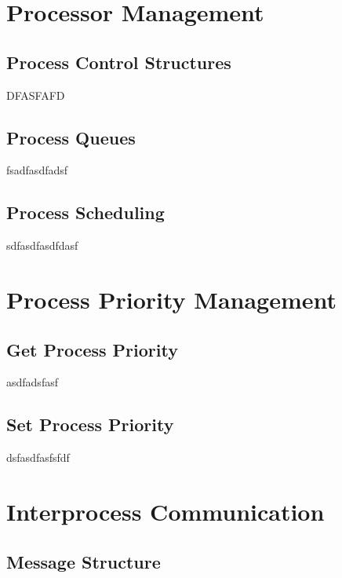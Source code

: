 \documentclass[12pt]{report}
\begin{document}
\pagebreak



\section{Processor Management}

\subsection{Process Control Structures}
DFASFAFD

\subsection{Process Queues}

fsadfasdfadsf

\subsection{Process Scheduling}
sdfasdfasdfdasf


\section{Process Priority Management}

\subsection{Get Process Priority}

asdfadsfasf

\subsection{Set Process Priority}

dsfasdfasfsfdf


\section{Interprocess Communication}

\subsection{Message Structure}
\end{document}
